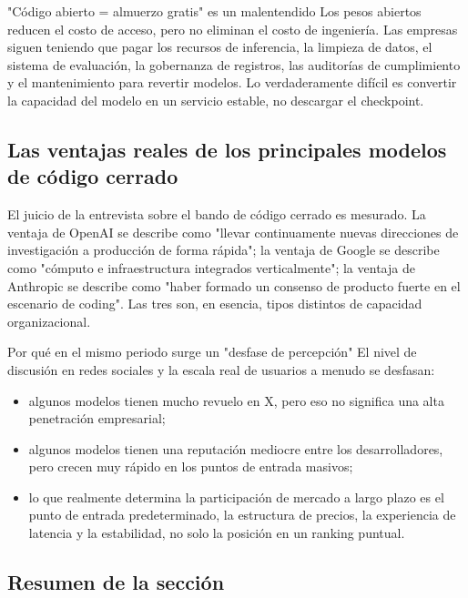 \documentclass[a4paper]{article}
\begin{document}
\begin{warningbox}{"Código abierto = almuerzo gratis" es un malentendido}
Los pesos abiertos reducen el costo de acceso, pero no eliminan el costo de ingeniería. Las empresas siguen teniendo que pagar los recursos de inferencia, la limpieza de datos, el sistema de evaluación, la gobernanza de registros, las auditorías de cumplimiento y el mantenimiento para revertir modelos. Lo verdaderamente difícil es convertir la capacidad del modelo en un servicio estable, no descargar el checkpoint.
\end{warningbox}

\subsection{Las ventajas reales de los principales modelos de código cerrado}

El juicio de la entrevista sobre el bando de código cerrado es mesurado. La ventaja de OpenAI se describe como "llevar continuamente nuevas direcciones de investigación a producción de forma rápida"; la ventaja de Google se describe como "cómputo e infraestructura integrados verticalmente"; la ventaja de Anthropic se describe como "haber formado un consenso de producto fuerte en el escenario de coding". Las tres son, en esencia, tipos distintos de capacidad organizacional.

\begin{knowledgebox}{Por qué en el mismo periodo surge un "desfase de percepción"}
El nivel de discusión en redes sociales y la escala real de usuarios a menudo se desfasan:
\begin{itemize}[leftmargin=1.5em]
    \item algunos modelos tienen mucho revuelo en X, pero eso no significa una alta penetración empresarial;
    \item algunos modelos tienen una reputación mediocre entre los desarrolladores, pero crecen muy rápido en los puntos de entrada masivos;
    \item lo que realmente determina la participación de mercado a largo plazo es el punto de entrada predeterminado, la estructura de precios, la experiencia de latencia y la estabilidad, no solo la posición en un ranking puntual.
\end{itemize}
\end{knowledgebox}

\subsection{Resumen de la sección}
\end{document}
